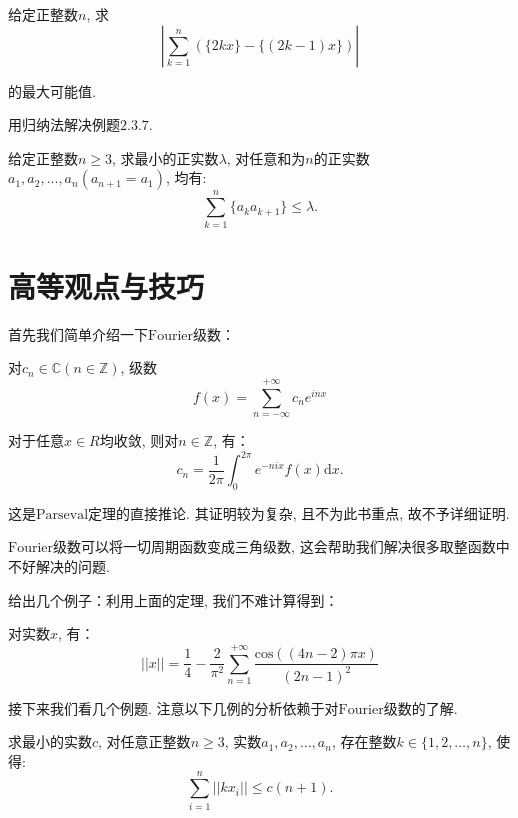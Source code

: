 \documentclass[lang=cn,12pt,thmcnt=section]{elegantbook}
\begin{document}
\exercisetitle

\begin{exercise}
给定正整数$n$, 求
\[
\left|\sum_{k=1}^n (\{2kx\}-\{(2k-1)x\})\right|
\]

的最大可能值.
\end{exercise}

\begin{exercise}
用归纳法解决例题$2.3.7$.
\end{exercise}

\begin{exercise}
给定正整数$n\ge 3$, 求最小的正实数$\lambda$, 对任意和为$n$的正实数$a_1,a_2,\dots{},a_n(a_{n+1}=a_1)$, 均有: 
\[
\sum_{k=1}^n \{a_ka_{k+1}\}\le \lambda.
\]
\end{exercise}

\section{高等观点与技巧}

首先我们简单介绍一下$\mathrm{Fourier}$级数：

\begin{theorem}
对$c_n\in \mathbb{C}(n\in \mathbb{Z})$, 级数
\[
f(x)=\sum_{n=-\infty}^{+\infty} c_n e^{inx}
\]

对于任意$x\in R$均收敛, 则对$n\in \mathbb{Z}$, 有：
\[
c_n=\frac{1}{2\pi}\int_{0}^{2\pi} e^{-nix}f(x)\mathrm{d}x.
\]
\end{theorem}

这是$\mathrm{Parseval}$定理的直接推论. 其证明较为复杂, 且不为此书重点, 故不予详细证明.

$\mathrm{Fourier}$级数可以将一切周期函数变成三角级数, 这会帮助我们解决很多取整函数中不好解决的问题. 

给出几个例子：利用上面的定理, 我们不难计算得到：

\begin{lemma}
对实数$x$, 有：
\[
||x||=\frac{1}{4}-\frac{2}{\pi^2}\sum_{n=1}^{+\infty}\frac{\mathrm{cos}\left((4n-2)\pi x\right)}{(2n-1)^2}
\]
\end{lemma}

接下来我们看几个例题. 注意以下几例的分析依赖于对$\mathrm{Fourier}$级数的了解.

\begin{example}
求最小的实数$c$, 对任意正整数$n\ge 3$, 实数$a_1,a_2,\dots{},a_n$, 存在整数$k\in\{1,2,\dots{},n\}$, 使得:
\[
\sum_{i=1}^n||kx_i||\le c(n+1). 
\]
\end{example}
\end{document}
